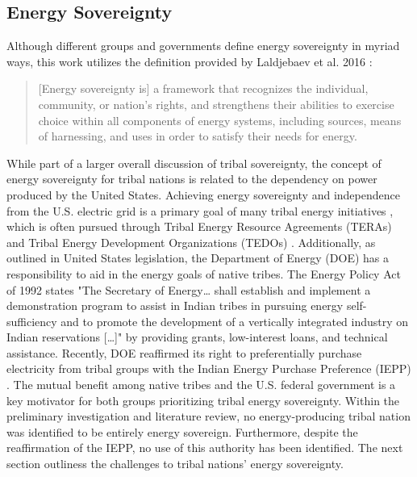 \documentclass{anstrans}
\begin{document}
\subsection{Energy Sovereignty}
Although different groups and governments define energy sovereignty in myriad
ways, this work utilizes the definition provided by Laldjebaev et al. 2016
\cite{laldjebaev_energy_2016}: 
\begin{quote}
  [Energy sovereignty is] a framework that recognizes the individual, community,
  or nation's rights, and strengthens their abilities to exercise choice within
  all components of energy systems, including sources, means of harnessing, and
  uses in order to satisfy their needs for energy.
\end{quote}
While part of a larger overall discussion of tribal sovereignty, the concept of
energy sovereignty for tribal nations is related to the dependency on power
produced by the United States. Achieving energy sovereignty and independence
from the U.S. electric grid is a primary goal of many tribal energy initiatives
\cite{western_area_power_administration_tribal_2010}, which is often pursued
through Tribal Energy Resource Agreements (TERAs) and Tribal Energy Development
Organizations (TEDOs) \cite{department_of_interior_25_2008}. Additionally, as
outlined in United States legislation, the Department of Energy (DOE) has a
responsibility to aid in the energy goals of native tribes. The Energy Policy
Act of 1992 \cite{rep_sharp_hr776_1992} states "The Secretary of Energy… shall
establish and implement a demonstration program to assist in Indian tribes in
pursuing energy self-sufficiency and to promote the development of a vertically
integrated industry on Indian reservations […]" by providing grants,
low-interest loans, and technical assistance. Recently, DOE reaffirmed its right
to preferentially purchase electricity from tribal groups with the Indian Energy
Purchase Preference (IEPP) \cite{granholm_memorandum_2023}. The mutual benefit
among native tribes and the U.S. federal government is a key motivator for both
groups prioritizing tribal energy sovereignty. Within the preliminary
investigation and literature review, no energy-producing tribal nation was
identified to be entirely energy sovereign. Furthermore, despite the
reaffirmation of the IEPP, no use of this authority has been identified. The
next section outliness the challenges to tribal nations' energy sovereignty.
\end{document}
